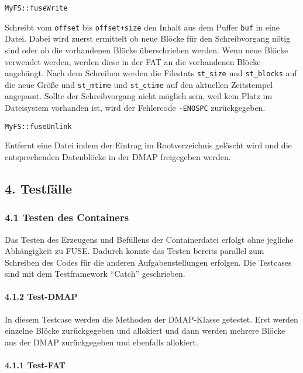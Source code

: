 \documentclass[]{article}
\let\oldparagraph\paragraph
\renewcommand{\paragraph}[1]{\oldparagraph{#1}\mbox{}}
\begin{document}
\texttt{MyFS::fuseWrite}

Schreibt vom \texttt{offset} bis \texttt{offset+size} den Inhalt aus dem
Puffer \texttt{buf} in eine Datei. Dabei wird zuerst ermittelt ob neue
Blöcke für den Schreibvorgang nötig sind oder ob die vorhandenen Blöcke
überschrieben werden. Wenn neue Blöcke verwendet werden, werden diese in
der FAT an die vorhandenen Blöcke angehängt. Nach dem Schreiben werden
die Filestats \texttt{st\_size} und \texttt{st\_blocks} auf die neue
Größe und \texttt{st\_mtime} und \texttt{st\_ctime} auf den aktuellen
Zeitstempel angepasst. Sollte der Schreibvorgang nicht möglich sein, weil
kein Platz im Dateisystem vorhanden ist, wird der Fehlercode
\texttt{-ENOSPC} zurückgegeben.

\texttt{MyFS::fuseUnlink}

Entfernt eine Datei indem der Eintrag im Rootverzeichnis gelöscht wird
und die entsprechenden Datenblöcke in der DMAP freigegeben werden.

\hypertarget{testfuxe4lle}{%
\subsection{4. Testfälle}\label{testfuxe4lle}}

\hypertarget{testen-des-containers}{%
\subsubsection{4.1 Testen des Containers}\label{testen-des-containers}}

Das Testen des Erzeugens und
Befüllens der Containerdatei erfolgt ohne jegliche Abhängigkeit zu FUSE.
Dadurch konnte das Testen bereits parallel zum Schreiben des Codes für
die anderen Aufgabenstellungen erfolgen. Die Testcases sind mit dem
Testframework ``Catch'' geschrieben.

\hypertarget{test-dmap}{%
\paragraph{4.1.2 Test-DMAP}\label{test-dmap}}

In diesem Testcase werden die Methoden der DMAP-Klasse getestet. Erst werden einzelne Blöcke zurückgegeben und allokiert und dann
werden mehrere Blöcke aus der DMAP zurückgegeben und ebenfalls allokiert.

\hypertarget{test-fat}{%
\paragraph{4.1.1 Test-FAT}\label{test-fat}}
\end{document}
